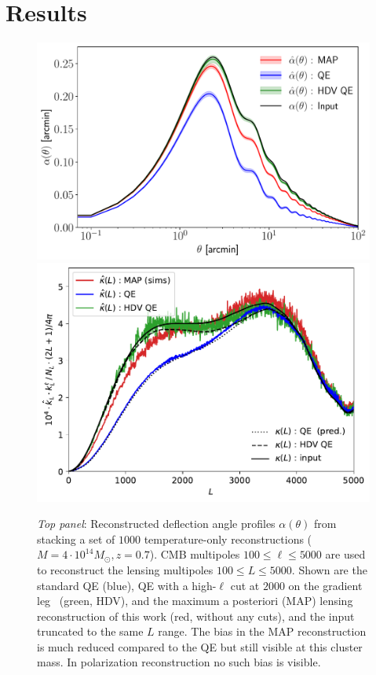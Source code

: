 \documentclass[prd, superscriptaddress, tightenlines, longbibliography, nofootinbib, eqsecnum, amsfonts, amsmath, floatfix, twocolumn, notitlepage]{revtex4-2}
\begin{document}
\section{Results}
\label{sec:results}
\begin{figure}
	\label{fig:kappa_th}
	\hspace*{-0.5cm}
	\centering
	\includegraphics[width=0.95\hsize]{Figures/alpha_thet_lmax5k_out5k_M4.pdf}
	\includegraphics[width=0.92\hsize]{Figures/biascomp}
	\caption{\emph{Top panel}: Reconstructed deflection angle profiles $\alpha(\theta)$ from stacking a set of $1000$ temperature-only reconstructions ($M = 4 \cdot 10^{14} M_\odot, z=0.7$). CMB multipoles $100 \leq \ell \leq 5000$ are used to reconstruct the lensing multipoles $100 \leq L \leq 5000$. Shown are the standard QE (blue), QE with a high-$\ell$ cut at $2000$ on the gradient leg~\cite{Hu:2007bt} (green, HDV), and the maximum a posteriori (MAP) lensing reconstruction of this work (red, without any cuts), and the input truncated to the same $L$ range. The bias in the MAP reconstruction is much reduced compared to the QE but still visible at this cluster mass. In polarization reconstruction no such bias is visible.
}
\end{figure}
\end{document}

